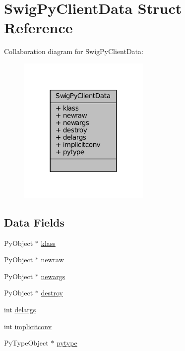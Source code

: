 \hypertarget{struct_swig_py_client_data}{\section{Swig\-Py\-Client\-Data Struct Reference}
\label{struct_swig_py_client_data}
}


Collaboration diagram for Swig\-Py\-Client\-Data\-:
\nopagebreak
\begin{figure}[H]
\begin{center}
\leavevmode
\includegraphics[width=180pt]{struct_swig_py_client_data__coll__graph}
\end{center}
\end{figure}
\subsection*{Data Fields}
\begin{DoxyCompactItemize}
\item 
Py\-Object $\ast$ \hyperlink{struct_swig_py_client_data_a74cf66d18e3e059f7dcc41a53729e84c}{klass}
\item 
Py\-Object $\ast$ \hyperlink{struct_swig_py_client_data_ac343cdc04c579bb3d46e9be516791975}{newraw}
\item 
Py\-Object $\ast$ \hyperlink{struct_swig_py_client_data_a3f965a13b63b1a28ab3880b8852f89d0}{newargs}
\item 
Py\-Object $\ast$ \hyperlink{struct_swig_py_client_data_a16b3d2144ed476f6f20f3897a874c430}{destroy}
\item 
int \hyperlink{struct_swig_py_client_data_acb70a26b5c3b873ee8492f96d6f04722}{delargs}
\item 
int \hyperlink{struct_swig_py_client_data_aefc03bc0f3c3a18125653ab9f5c5486e}{implicitconv}
\item 
Py\-Type\-Object $\ast$ \hyperlink{struct_swig_py_client_data_a2cb2eada29f00a41140382c4d3bfad61}{pytype}
\end{DoxyCompactItemize}



